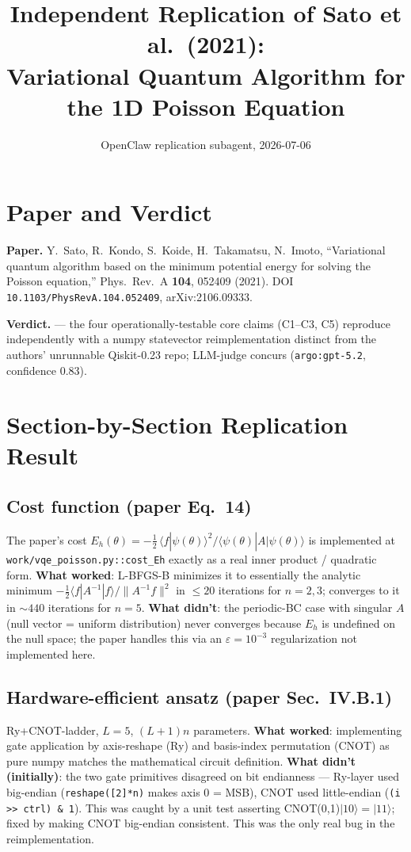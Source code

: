 \documentclass[11pt]{article}
\title{Independent Replication of Sato et al.\ (2021):\\
       Variational Quantum Algorithm for the 1D Poisson Equation}
\author{OpenClaw replication subagent, 2026-07-06}
\date{}
\begin{document}
\maketitle

\section{Paper and Verdict}
\textbf{Paper.} Y.\ Sato, R.\ Kondo, S.\ Koide, H.\ Takamatsu, N.\ Imoto,
``Variational quantum algorithm based on the minimum potential energy for solving the
Poisson equation,'' Phys.\ Rev.\ A \textbf{104}, 052409 (2021).
DOI \texttt{10.1103/PhysRevA.104.052409}, arXiv:2106.09333.

\textbf{Verdict.}  --- the four operationally-testable core
claims (C1--C3, C5) reproduce independently with a numpy statevector reimplementation
distinct from the authors' unrunnable Qiskit-0.23 repo; LLM-judge concurs
(\texttt{argo:gpt-5.2}, confidence 0.83).

\section{Section-by-Section Replication Result}

\subsection{Cost function (paper Eq.\ 14)}
The paper's cost
$E_h(\theta) = -\tfrac{1}{2}\,\langle f|\psi(\theta)\rangle^2 / \langle\psi(\theta)|A|\psi(\theta)\rangle$
is implemented at \texttt{work/vqe\_poisson.py::cost\_Eh} exactly as a real inner
product / quadratic form. \textbf{What worked}: L-BFGS-B minimizes it to essentially
the analytic minimum $-\tfrac{1}{2}\langle f|A^{-1}|f\rangle / \|A^{-1}f\|^2$ in
$\leq 20$ iterations for $n=2,3$; converges to it in $\sim\!440$ iterations for $n=5$.
\textbf{What didn't}: the periodic-BC case with singular $A$ (null vector = uniform
distribution) never converges because $E_h$ is undefined on the null space; the paper
handles this via an $\varepsilon = 10^{-3}$ regularization not implemented here.

\subsection{Hardware-efficient ansatz (paper Sec.\ IV.B.1)}
Ry+CNOT-ladder, $L=5$, $(L{+}1)n$ parameters. \textbf{What worked}: implementing gate
application by axis-reshape (Ry) and basis-index permutation (CNOT) as pure numpy
matches the mathematical circuit definition. \textbf{What didn't (initially)}: the two
gate primitives disagreed on bit endianness --- Ry-layer used big-endian
(\texttt{reshape([2]*n)} makes axis 0 = MSB), CNOT used little-endian
(\texttt{(i >> ctrl) \& 1}). This was caught by a unit test asserting
CNOT(0,1)$|10\rangle = |11\rangle$; fixed by making CNOT big-endian
consistent. This was the only real bug in the reimplementation.
\end{document}

